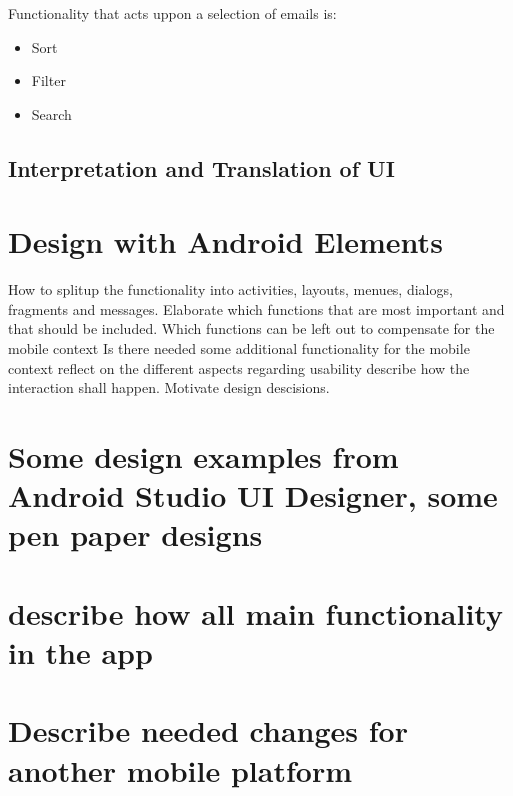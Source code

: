\documentclass[a4paper,11pt,twoside]{article}
\begin{document}
Functionality that acts uppon a selection of emails is:
\begin{itemize}
  \item Sort
  \item Filter
  \item Search
\end{itemize}






\subsection{Interpretation and Translation of UI}



\section{Design with Android Elements}
How to splitup the functionality into activities, layouts, menues, dialogs, fragments and messages.
Elaborate which functions that are most important and that should be included.
Which functions can be left out to compensate for the mobile context
Is there needed some additional functionality for the mobile context
reflect on the different aspects regarding usability
describe how the interaction shall happen.
Motivate design descisions.

\section{Some design examples from Android Studio UI Designer, some pen paper designs}

\section{describe how all main functionality in the app}


\section{Describe needed changes for another mobile platform}



\end{document}
